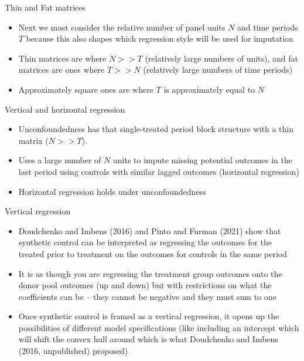 \documentclass{beamer}
\begin{document}
\begin{frame}{Thin and Fat matrices}

\begin{itemize}
\item Next we must consider the relative number of panel units $N$ and time periods $T$ because this also shapes which regression style will be used for imputation
\item Thin matrices are where $N>>T$ (relatively large numbers of units), and fat matrices are ones where $T>>N$ (relatively large numbers of time periods)
\item Approximately square ones are where $T$ is approximately equal to $N$
\end{itemize}

\end{frame}


\begin{frame}{Vertical and horizontal regression}

\begin{itemize}
\item Unconfoundedness has that single-treated period block structure with a thin matrix ($N>>T$). 
\item Uses a large number of $N$ units to impute missing potential outcomes in the last period using controls with similar lagged outcomes (horizontal regression)
\item Horizontal regression holds under unconfoundedness
\end{itemize}

\end{frame}

\begin{frame}{Vertical regression}

\begin{itemize}
\item Doudchenko and Imbens (2016) and Pinto and Furman (2021) show that synthetic control can be interpreted as regressing the outcomes for the treated prior to treatment on the outcomes for controls in the same period
\item It is as though you are regressing the treatment group outcomes onto the donor pool outcomes (up and down) but with restrictions on what the coefficients can be -- they cannot be negative and they must sum to one
\item Once synthetic control is framed as a vertical regression, it opens up the possibilities of different model specifications (like including an intercept which will shift the convex hull around which is what Doudchenko and Imbens (2016, unpublished) proposed)
\end{itemize}

\end{frame}
\end{document}
